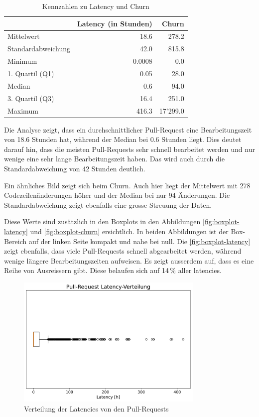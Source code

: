 \begin{table}[htbp]
    \centering
    \caption{Kennzahlen zu Latency und Churn}
    \begin{tabular}{@{}lrr@{}}
        \toprule
        \textbf & \textbf{Latency (in Stunden)} & \textbf{Churn} \\
         \midrule
        Mittelwert & 18.6 & 278.2 \\
        Standardabweichung &  42.0  & 815.8 \\
        Minimum & 0.0008 & 0.0 \\
        1. Quartil (Q1) & 0.05 & 28.0 \\
        Median & 0.6 & 94.0 \\
        3. Quartil (Q3) &  16.4   & 251.0 \\
        Maximum & 416.3 & 17'299.0 \\
        \bottomrule
    \end{tabular}
    \label{tab:deskriptive-kennzahlen}
\end{table}

Die Analyse zeigt, dass ein durchschnittlicher Pull-Request eine Bearbeitungszeit von 18.6 Stunden hat, während der Median bei 0.6 Stunden liegt. Dies deutet darauf hin, dass die meisten Pull-Requests sehr schnell bearbeitet werden und nur wenige eine sehr lange Bearbeitungszeit haben. Das wird auch durch die Standardabweichung von 42 Stunden deutlich.

Ein ähnliches Bild zeigt sich beim Churn. Auch hier liegt der Mittelwert mit 278 Codezeilenänderungen höher und der Median bei nur 94 Änderungen. Die Standardabweichung zeigt ebenfalls eine grosse Streuung der Daten.

Diese Werte sind zusätzlich in den Boxplots in den Abbildungen \autoref{fig:boxplot-latency} und \autoref{fig:boxplot-churn} ersichtlich. 
In beiden Abbildungen ist der Box-Bereich auf der linken Seite kompakt und nahe bei null. 
Die \autoref{fig:boxplot-latency} zeigt ebenfalls, dass viele Pull-Requests schnell abgearbeitet werden, während wenige längere Bearbeitungszeiten aufweisen. Es zeigt ausserdem auf, dass es eine Reihe von Ausreissern gibt. Diese belaufen sich auf 14\,\% aller latencies.

\begin{figure}[htbp]
    \includegraphics[width=0.8\textwidth]{Figures/boxplot-latency.pdf}
    \centering
    \caption{Verteilung der Latencies von den Pull-Requests}
    \label{fig:boxplot-latency}
\end{figure}

